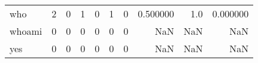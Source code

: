 \begin{longtable}{lrrrrrrrrr}
who       &                                       2 &                                                  0 &                                                  1 &                                                  0 &                                                  1 &                                                  0 &                                           0.500000 &                                    1.0 &                             0.000000 \\
whoami    &                                       0 &                                                  0 &                                                  0 &                                                  0 &                                                  0 &                                                  0 &                                                NaN &                                    NaN &                                  NaN \\
yes       &                                       0 &                                                  0 &                                                  0 &                                                  0 &                                                  0 &                                                  0 &                                                NaN &                                    NaN &                                  NaN \\
\end{longtable}

